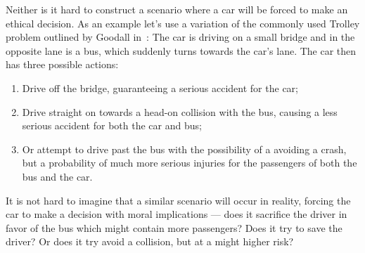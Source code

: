 Neither is it hard to construct a scenario where a car will be forced to make an
ethical decision. As an example let's use a variation of the commonly used
Trolley problem outlined by Goodall in~\cite{goodall_2014_ethical_edmdavc}: The
car is driving on a small bridge and in the opposite lane is a bus, which
suddenly turns towards the car's lane. The car then has three possible actions:
\begin{enumerate}
\item Drive off the bridge, guaranteeing a serious accident for the car;
\item Drive straight on towards a head-on collision with the bus, causing a less
  serious accident for both the car and bus;
\item Or attempt to drive past the bus with the possibility of a avoiding a
  crash, but a probability of much more serious injuries for the passengers of
  both the bus and the car.
\end{enumerate}
It is not hard to imagine that a similar scenario will occur in reality, forcing
the car to make a decision with moral implications --- does it sacrifice the
driver in favor of the bus which might contain more passengers? Does it try to
save the driver? Or does it try avoid a collision, but at a might higher risk?
